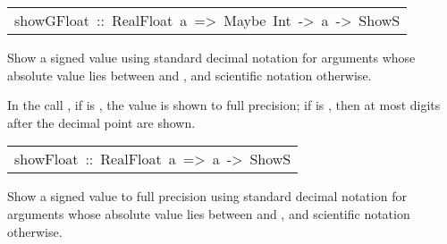 \begin{haddockdesc}
\item[\begin{tabular}{@{}l}
showGFloat\ ::\ RealFloat\ a\ =>\ Maybe\ Int\ ->\ a\ ->\ ShowS
\end{tabular}]\haddockbegindoc
Show a signed  value
 using standard decimal notation for arguments whose absolute value lies 
 between  and , and scientific notation otherwise.
\par
In the call , if  is ,
 the value is shown to full precision; if  is ,
 then at most  digits after the decimal point are shown.
\par

\end{haddockdesc}
\begin{haddockdesc}
\item[\begin{tabular}{@{}l}
showFloat\ ::\ RealFloat\ a\ =>\ a\ ->\ ShowS
\end{tabular}]\haddockbegindoc
Show a signed  value to full precision
 using standard decimal notation for arguments whose absolute value lies 
 between  and , and scientific notation otherwise.
\par

\end{haddockdesc}
